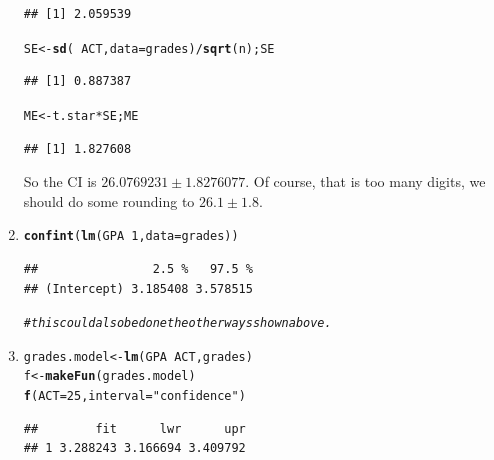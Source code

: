 \documentclass[twoside]{book}\usepackage[]{graphicx}\usepackage[]{xcolor}
\makeatletter
\newcommand{\hlnum}[1]{\textcolor[rgb]{0.686,0.059,0.569}{#1}}%
\newcommand{\hlstr}[1]{\textcolor[rgb]{0.192,0.494,0.8}{#1}}%
\newcommand{\hlcom}[1]{\textcolor[rgb]{0.678,0.584,0.686}{\textit{#1}}}%
\newcommand{\hlopt}[1]{\textcolor[rgb]{0,0,0}{#1}}%
\newcommand{\hlstd}[1]{\textcolor[rgb]{0.345,0.345,0.345}{#1}}%
\newcommand{\hlkwb}[1]{\textcolor[rgb]{0.69,0.353,0.396}{#1}}%
\newcommand{\hlkwc}[1]{\textcolor[rgb]{0.333,0.667,0.333}{#1}}%
\newcommand{\hlkwd}[1]{\textcolor[rgb]{0.737,0.353,0.396}{\textbf{#1}}}%
\newenvironment{kframe}{%
 \def\at@end@of@kframe{}%
 \ifinner\ifhmode%
  \def\at@end@of@kframe{\end{minipage}}%
  \begin{minipage}{\columnwidth}%
 \fi\fi%
 \def\FrameCommand##1{\hskip\@totalleftmargin \hskip-\fboxsep
 \colorbox{shadecolor}{##1}\hskip-\fboxsep
     \hskip-\linewidth \hskip-\@totalleftmargin \hskip\columnwidth}%
 \MakeFramed {\advance\hsize-\width
   \@totalleftmargin\z@ \linewidth\hsize
   \@setminipage}}%
 {\par\unskip\endMakeFramed%
 \at@end@of@kframe}
\newenvironment{knitrout}{}{} %
\makeatother
\begin{document}
\begin{solution}
\begin{enumerate}
\begin{knitrout}
\begin{kframe}
\begin{alltt}
\end{alltt}
\begin{verbatim}
## [1] 2.059539
\end{verbatim}
\begin{alltt}
\hlstd{SE} \hlkwb{<-} \hlkwd{sd}\hlstd{(}\hlopt{~}\hlstd{ACT,} \hlkwc{data}\hlstd{=grades)} \hlopt{/} \hlkwd{sqrt}\hlstd{(n); SE}
\end{alltt}
\begin{verbatim}
## [1] 0.887387
\end{verbatim}
\begin{alltt}
\hlstd{ME} \hlkwb{<-} \hlstd{t.star} \hlopt{*} \hlstd{SE; ME}
\end{alltt}
\begin{verbatim}
## [1] 1.827608
\end{verbatim}
\end{kframe}
\end{knitrout}
			So the CI is $26.0769231 \pm 1.8276077$.  Of course, that is too many digits, we 
			should do some rounding to
			$26.1 \pm 1.8$.  
		\item
\begin{knitrout}
\color{fgcolor}\begin{kframe}
\begin{alltt}
\hlkwd{confint}\hlstd{(}\hlkwd{lm}\hlstd{(GPA} \hlopt{~} \hlnum{1}\hlstd{,} \hlkwc{data}\hlstd{=grades))}
\end{alltt}
\begin{verbatim}
##                2.5 %   97.5 %
## (Intercept) 3.185408 3.578515
\end{verbatim}
\begin{alltt}
\hlcom{# this could also be done the other ways shown above.}
\end{alltt}
\end{kframe}
\end{knitrout}
		\item
\begin{knitrout}
\color{fgcolor}\begin{kframe}
\begin{alltt}
\hlstd{grades.model} \hlkwb{<-} \hlkwd{lm}\hlstd{(GPA}\hlopt{~}\hlstd{ACT,grades)}
\hlstd{f} \hlkwb{<-} \hlkwd{makeFun}\hlstd{(grades.model)}
\hlkwd{f}\hlstd{(}\hlkwc{ACT}\hlstd{=}\hlnum{25}\hlstd{,} \hlkwc{interval}\hlstd{=}\hlstr{"confidence"}\hlstd{)}
\end{alltt}
\begin{verbatim}
##        fit      lwr      upr
## 1 3.288243 3.166694 3.409792
\end{verbatim}
\end{kframe}
\end{knitrout}
		

\end{enumerate}
\end{solution}
\end{document}

